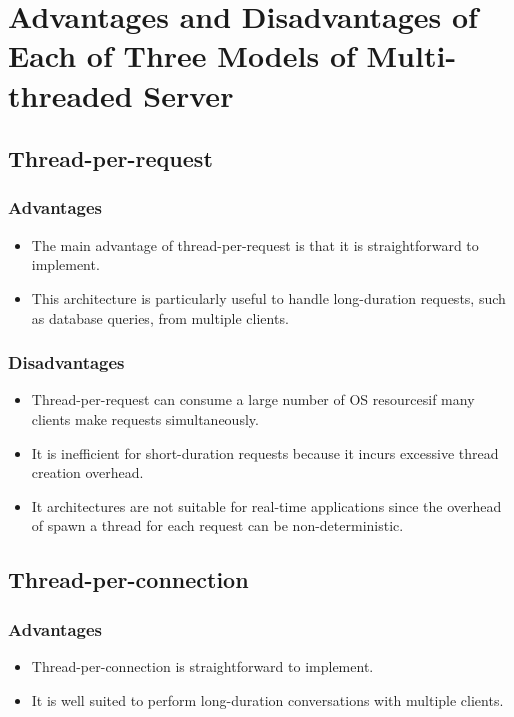 \documentclass[11pt,a4paper]{article}
\begin{document}
	\section{Advantages and Disadvantages of Each of Three Models of Multi-threaded Server}
		\subsection{Thread-per-request}
			\subsubsection{Advantages}
			\begin{itemize}
				\item The main advantage of thread-per-request is that it is  straightforward to implement.
				\item This architecture is particularly useful to handle long-duration requests, such as database queries, from multiple clients.
			\end{itemize}
			\subsubsection{Disadvantages}
			\begin{itemize}
				\item Thread-per-request can consume a large number of OS resourcesif many clients make requests simultaneously.
				\item It is inefficient for short-duration requests because it incurs excessive thread creation overhead.  
				\item It architectures are not suitable for real-time applications since the overhead of spawn a thread for each request can be non-deterministic.
			\end{itemize}
		\subsection{Thread-per-connection}
			\subsubsection{Advantages}
			\begin{itemize}
				\item Thread-per-connection is straightforward to implement.
				\item It is well suited to perform long-duration conversations  with multiple clients.
			\end{itemize}
\end{document}
